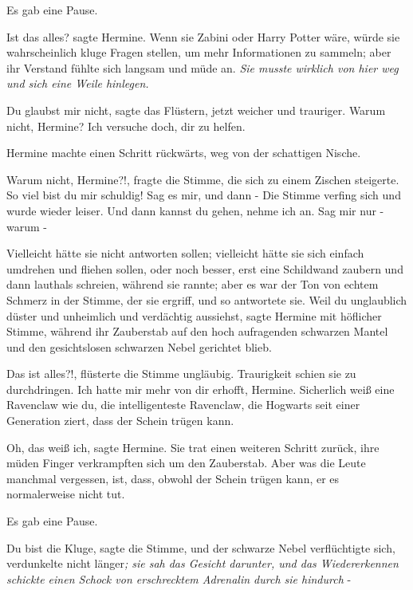 Es gab eine Pause.

\glqq{}Ist das alles?\grqq{} sagte Hermine. Wenn sie Zabini oder Harry Potter
wäre, würde sie wahrscheinlich kluge Fragen stellen, um mehr Informationen zu
sammeln; aber ihr Verstand fühlte sich langsam und müde an. \emph{Sie musste
wirklich von hier weg und sich eine Weile hinlegen.}

\glqq{}Du glaubst mir nicht\grqq{}, sagte das Flüstern, jetzt weicher und
trauriger. \glqq{}Warum nicht, Hermine? Ich versuche doch, dir zu helfen.\grqq{}

Hermine machte einen Schritt rückwärts, weg von der schattigen Nische.

\glqq{}Warum nicht, Hermine?!\grqq{}, fragte die Stimme, die sich zu einem
Zischen steigerte. \glqq{}So viel bist du mir schuldig! Sag es mir, und dann
-\grqq{} Die Stimme verfing sich und wurde wieder leiser. \glqq{}Und dann kannst
du gehen, nehme ich an. Sag mir nur - warum -\grqq{}

Vielleicht hätte sie nicht antworten sollen; vielleicht hätte sie sich einfach
umdrehen und fliehen sollen, oder noch besser, erst eine Schildwand zaubern und
dann lauthals schreien, während sie rannte; aber es war der Ton von echtem
Schmerz in der Stimme, der sie ergriff, und so antwortete sie. \glqq{}Weil du
unglaublich düster und unheimlich und verdächtig aussiehst\grqq{}, sagte Hermine
mit höflicher Stimme, während ihr Zauberstab auf den hoch aufragenden schwarzen
Mantel und den gesichtslosen schwarzen Nebel gerichtet blieb.

\glqq{}Das ist alles?!\grqq{}, flüsterte die Stimme ungläubig. Traurigkeit schien
sie zu durchdringen. \glqq{}Ich hatte mir mehr von dir erhofft, Hermine.
Sicherlich weiß eine Ravenclaw wie du, die intelligenteste Ravenclaw, die
Hogwarts seit einer Generation ziert, dass der Schein trügen kann.\grqq{}

\glqq{}Oh, das weiß ich\grqq{}, sagte Hermine. Sie trat einen weiteren Schritt
zurück, ihre müden Finger verkrampften sich um den Zauberstab. \glqq{}Aber was
die Leute manchmal vergessen, ist, dass, obwohl der Schein trügen kann, er es
normalerweise nicht tut.\grqq{}

Es gab eine Pause.

\glqq{}Du bist die Kluge\grqq{}, sagte die Stimme, und der schwarze Nebel
verflüchtigte sich, verdunkelte nicht länger\emph{; sie sah das Gesicht
darunter, und das Wiedererkennen schickte einen Schock von erschrecktem
Adrenalin durch sie hindurch} -

